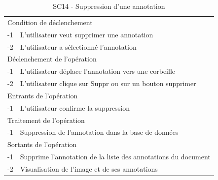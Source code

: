 \documentclass[a4paper]{article}
\begin{document}
\begin{table}[H]
  \centering
   \small
	\begin{tabular}{|c|p{12cm}|}
   		\hline
   			\rowcolor{lightgray}\multicolumn{2}{|c|}{\textbf{SC14 - Suppression d'une annotation}} \\
   		\hline
   			\multicolumn{2}{|l|}{Condition de d\'eclenchement} \\
   		\hline
   			-1 & L’utilisateur veut supprimer une annotation\\
			-2 & L’utilisateur a sélectionné l’annotation\\
   		\hline
   			\multicolumn{2}{|l|}{D\'eclenchement de l'op\'eration} \\
   		\hline
   			-1 & L’utilisateur déplace l’annotation vers une corbeille\\
			-2 & L’utilisateur clique sur Suppr ou sur un bouton supprimer\\
   		\hline
   			\multicolumn{2}{|l|}{Entrants de l'op\'eration} \\
   		\hline
   			-1 & L’utilisateur confirme la suppression\\
   		\hline
   			\multicolumn{2}{|l|}{Traitement de l'op\'eration} \\
  		\hline
   			-1 & Suppression de l’annotation dans la base de données\\
   		\hline
   			\multicolumn{2}{|l|}{Sortants de l'op\'eration} \\
   		\hline
   			-1 & Supprime l’annotation de la liste des annotations du document\\
			-2 & Visualisation de l’image et de ses annotations\\
   		\hline
	\end{tabular}
  \caption{SC14 - Suppression d'une annotation}
  \normalsize
  \label{tab:supprimer_annotation}
\end{table}
\end{document}
